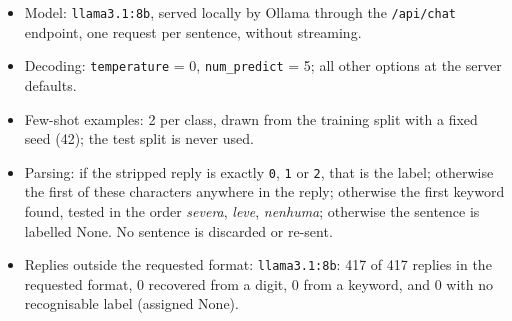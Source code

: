 \begin{itemize}
\item Model: \texttt{llama3.1:8b}, served locally by Ollama through the \texttt{/api/chat}
  endpoint, one request per sentence, without streaming.
\item Decoding: \texttt{temperature} = 0, \texttt{num\_predict} = 5; all other options at
  the server defaults.
\item Few-shot examples: 2 per class, drawn from the training split with a fixed seed
  (42); the test split is never used.
\item Parsing: if the stripped reply is exactly \texttt{0}, \texttt{1} or \texttt{2}, that
  is the label; otherwise the first of these characters anywhere in the reply; otherwise
  the first keyword found, tested in the order \emph{severa}, \emph{leve}, \emph{nenhuma};
  otherwise the sentence is labelled None. No sentence is discarded or re-sent.
\item Replies outside the requested format: \texttt{llama3.1:8b}: 417 of 417 replies in
  the requested format, 0 recovered from a digit, 0 from a keyword, and 0 with no
  recognisable label (assigned None).
\end{itemize}
